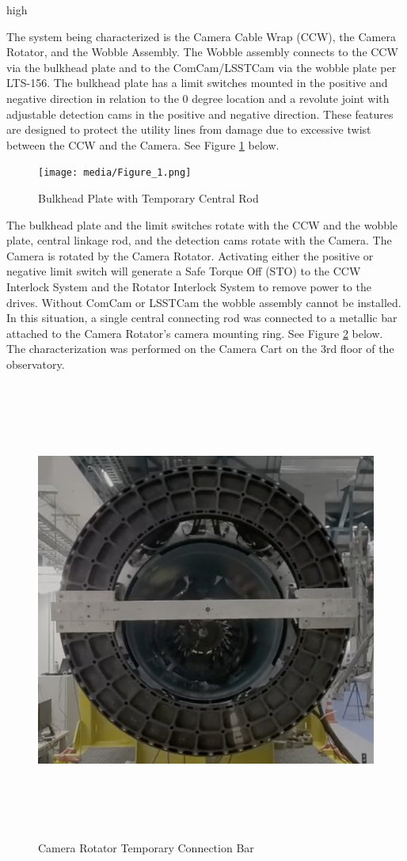 high\documentclass[SE,lsstdraft,authoryear,toc]{lsstdoc}
\begin{document}
The system being characterized is the Camera Cable Wrap (CCW), the
Camera Rotator, and the Wobble Assembly. The Wobble assembly connects to
the CCW via the bulkhead plate and to the ComCam/LSSTCam via the wobble
plate per LTS-156. The bulkhead plate has a limit switches mounted in
the positive and negative direction in relation to the 0 degree location
and a revolute joint with adjustable detection cams in the positive and
negative direction. These features are designed to protect the utility
lines from damage due to excessive twist between the CCW and the Camera.
See Figure \ref{fig:Figure_1} below.

\begin{figure}[h!]
  \texttt{[image: media/Figure\_1.png]}
  \caption{Bulkhead Plate with Temporary Central Rod}
  \label{fig:Figure_1}
\end{figure}

The bulkhead plate and the limit switches rotate
with the CCW and the wobble plate, central linkage rod, and the
detection cams rotate with the Camera. The Camera is rotated by the
Camera Rotator. Activating either the positive or negative limit switch
will generate a Safe Torque Off (STO) to the CCW Interlock System and
the Rotator Interlock System to remove power to the drives. Without
ComCam or LSSTCam the wobble assembly cannot be installed. In this
situation, a single central connecting rod was connected to a metallic
bar attached to the Camera Rotator's camera mounting ring. See Figure \ref{fig:Figure_2}
below. The characterization was performed on the Camera Cart on the 3rd
floor of the observatory.

\begin{figure}[h!]
  \includegraphics[width=6.5in,height=5.96389in]{media/Figure_2.png}
  \caption{Camera Rotator Temporary Connection Bar}
  \label{fig:Figure_2}
\end{figure}
\end{document}

